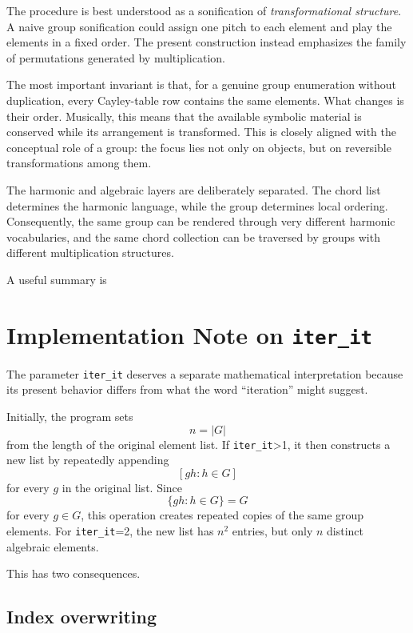 \documentclass[11pt,a4paper]{article}
\begin{document}
The procedure is best understood as a sonification of \emph{transformational structure}. A naive group sonification could assign one pitch to each element and play the elements in a fixed order. The present construction instead emphasizes the family of permutations generated by multiplication.

The most important invariant is that, for a genuine group enumeration without duplication, every Cayley-table row contains the same elements. What changes is their order. Musically, this means that the available symbolic material is conserved while its arrangement is transformed. This is closely aligned with the conceptual role of a group: the focus lies not only on objects, but on reversible transformations among them.

The harmonic and algebraic layers are deliberately separated. The chord list determines the harmonic language, while the group determines local ordering. Consequently, the same group can be rendered through very different harmonic vocabularies, and the same chord collection can be traversed by groups with different multiplication structures.

A useful summary is
\begin{center}
\end{center}

\section{Implementation Note on \texttt{iter\_it}}

The parameter \texttt{iter\_it} deserves a separate mathematical interpretation because its present behavior differs from what the word ``iteration'' might suggest.

Initially, the program sets
\[
n=|G|
\]
from the length of the original element list. If \texttt{iter\_it}>1, it then constructs a new list by repeatedly appending
\[
[g h : h\in G]
\]
for every $g$ in the original list. Since
\[
\{gh:h\in G\}=G
\]
for every $g\in G$, this operation creates repeated copies of the same group elements. For \texttt{iter\_it}=2, the new list has $n^2$ entries, but only $n$ distinct algebraic elements.

This has two consequences.

\subsection{Index overwriting}
\end{document}
